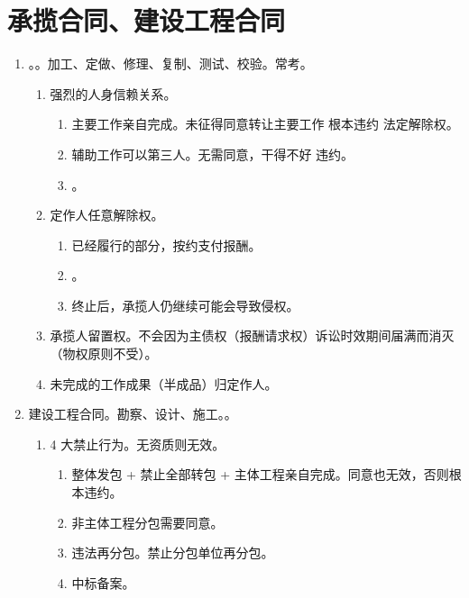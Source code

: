 \section{承揽合同、建设工程合同}
\begin{enumerate}
  \item {}。。加工、定做、修理、复制、测试、校验。常考。
        \begin{enumerate}
          \item 强烈的人身信赖关系。
                \begin{enumerate}
                  \item 主要工作亲自完成。未征得同意转让主要工作 \yjt 根本违约 \yjt 法定解除权。
                  \item 辅助工作可以第三人。无需同意，干得不好 \yjt 违约。
                  \item {}。
                \end{enumerate}
          \item 定作人任意解除权。
                \begin{enumerate}
                  \item 已经履行的部分，按约支付报酬。
                  \item {}。
                  \item 终止后，承揽人仍继续可能会导致侵权。
                \end{enumerate}
          \item 承揽人留置权。不会因为主债权（报酬请求权）诉讼时效期间届满而消灭（物权原则不受）。
          \item 未完成的工作成果（半成品）归定作人。
        \end{enumerate}
  \item 建设工程合同。勘察、设计、施工。。
        \begin{enumerate}
          \item 4 大禁止行为。无资质则无效。
                \begin{enumerate}
                  \item 整体发包 + 禁止全部转包 + 主体工程亲自完成。同意也无效，否则根本违约。
                  \item 非主体工程分包需要同意。
                  \item 违法再分包。禁止分包单位再分包。
                  \item 中标备案。
                \end{enumerate}

\end{enumerate}
\end{enumerate}
